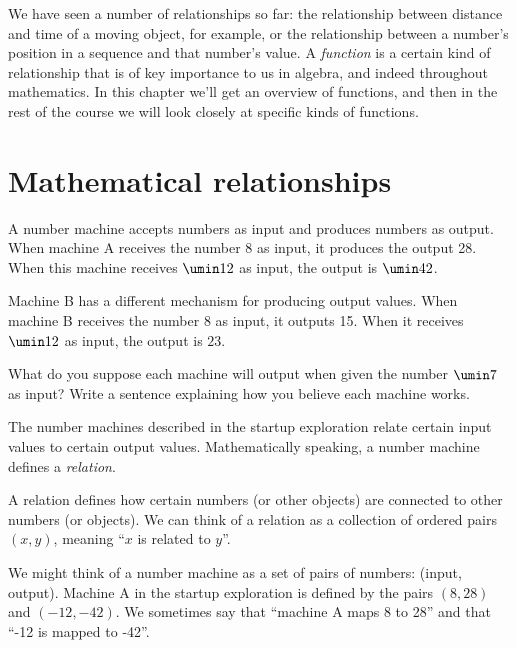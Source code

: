 We have seen a number of relationships so far: the relationship between distance and time of a moving object, for example, or the relationship between a number's position in a sequence and that number's value. A \textit{function} is a certain kind of relationship that is of key importance to us in algebra, and indeed throughout mathematics. In this chapter we'll get an overview of functions, and then in the rest of the course we will look closely at specific kinds of functions.

\section{Mathematical relationships}
\label{sec:mathrelationships}

\begin{boxedexplore}
\end{boxedexplore}

\begin{boxedexplore}
A number machine accepts numbers as input and produces numbers as output. When machine A receives the number 8 as input, it produces the output 28. When this machine receives $\umin12$ as input, the output is $\umin42$.

Machine B has a different mechanism for producing output values. When machine B receives the number 8 as input, it outputs 15. When it receives $\umin12$ as input, the output is $23$.

What do you suppose each machine will output when given the number $\umin7$ as input? Write a sentence explaining how you believe each machine works.
\end{boxedexplore} %

The number machines described in the startup exploration relate certain input values to certain output values. Mathematically speaking, a number machine defines a \textit{relation}.

\begin{boxeddef}[Relation]
A \gls{relation} defines how certain numbers (or other objects) are connected to other numbers (or objects). We can think of a relation as a collection of ordered pairs $(x,y)$, meaning ``$x$ is related to $y$''.
\end{boxeddef}

We might think of a number machine as a set of pairs of numbers: (input, output). Machine A in the startup exploration is defined by the pairs $(8, 28)$ and $(-12, -42)$. We sometimes say that ``machine A maps 8 to 28'' and that ``-12 is mapped to -42''.

